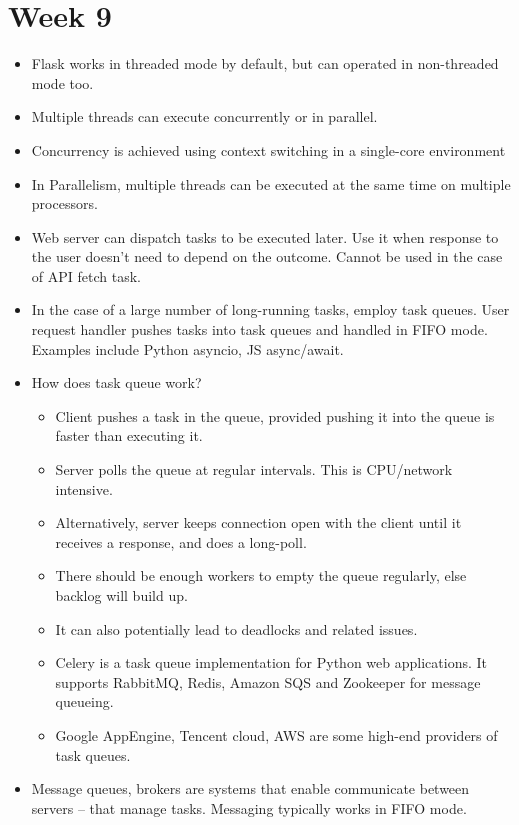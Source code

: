 \documentclass[a4paper]{article}
\begin{document}
\section{Week 9}
\begin{itemize}
    \item Flask works in threaded mode by default, but can operated in non-threaded mode too.
    \item Multiple threads can execute concurrently or in parallel.
    \item Concurrency is achieved using context switching in a single-core environment
    \item In Parallelism, multiple threads can be executed at the same time on multiple processors.
    \item Web server can dispatch tasks to be executed later. Use it when response to the user doesn’t need to depend on the outcome. Cannot be used in the case of API fetch task.
    \item In the case of a large number of long-running tasks, employ task queues. User request handler pushes tasks into task queues and handled in FIFO mode.  Examples include Python asyncio, JS async/await.
    \item How does task queue work?
    \begin{itemize}
        \item Client pushes a task in the queue, provided pushing it into the queue is faster than executing it.
        \item Server polls  the queue at regular intervals. This is CPU/network intensive.
        \item Alternatively, server keeps connection open with the client  until it receives a response, and does a long-poll.
        \item There should be enough workers to empty the queue regularly, else backlog will build up. 
        \item It can also potentially lead to deadlocks and related issues.
        \item Celery is a task queue implementation for Python web applications. It supports RabbitMQ, Redis, Amazon SQS and Zookeeper for message queueing.
        \item Google AppEngine, Tencent cloud, AWS are some high-end providers of task queues.
    \end{itemize}
    \item Message queues, brokers are systems that enable communicate between servers – that manage tasks. Messaging typically works in FIFO mode.

\end{itemize}
\end{document}
